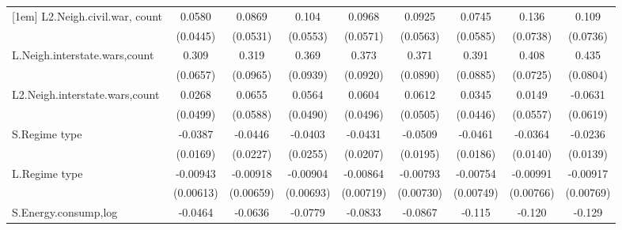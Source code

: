 \begin{table}[htbp]
\begin{tabular}{l*{8}{c}}
[1em]
L2.Neigh.civil.war, count&      0.0580         &      0.0869         &       0.104\sym{*}  &      0.0968\sym{*}  &      0.0925\sym{*}  &      0.0745         &       0.136\sym{*}  &       0.109         \\
                    &    (0.0445)         &    (0.0531)         &    (0.0553)         &    (0.0571)         &    (0.0563)         &    (0.0585)         &    (0.0738)         &    (0.0736)         \\
[1em]
L.Neigh.interstate.wars,count&       0.309\sym{***}&       0.319\sym{***}&       0.369\sym{***}&       0.373\sym{***}&       0.371\sym{***}&       0.391\sym{***}&       0.408\sym{***}&       0.435\sym{***}\\
                    &    (0.0657)         &    (0.0965)         &    (0.0939)         &    (0.0920)         &    (0.0890)         &    (0.0885)         &    (0.0725)         &    (0.0804)         \\
[1em]
L2.Neigh.interstate.wars,count&      0.0268         &      0.0655         &      0.0564         &      0.0604         &      0.0612         &      0.0345         &      0.0149         &     -0.0631         \\
                    &    (0.0499)         &    (0.0588)         &    (0.0490)         &    (0.0496)         &    (0.0505)         &    (0.0446)         &    (0.0557)         &    (0.0619)         \\
[1em]
S.Regime type       &     -0.0387\sym{**} &     -0.0446\sym{**} &     -0.0403         &     -0.0431\sym{**} &     -0.0509\sym{***}&     -0.0461\sym{**} &     -0.0364\sym{***}&     -0.0236\sym{*}  \\
                    &    (0.0169)         &    (0.0227)         &    (0.0255)         &    (0.0207)         &    (0.0195)         &    (0.0186)         &    (0.0140)         &    (0.0139)         \\
[1em]
L.Regime type       &    -0.00943         &    -0.00918         &    -0.00904         &    -0.00864         &    -0.00793         &    -0.00754         &    -0.00991         &    -0.00917         \\
                    &   (0.00613)         &   (0.00659)         &   (0.00693)         &   (0.00719)         &   (0.00730)         &   (0.00749)         &   (0.00766)         &   (0.00769)         \\
[1em]
S.Energy.consump,log&     -0.0464         &     -0.0636         &     -0.0779         &     -0.0833         &     -0.0867         &      -0.115         &      -0.120         &      -0.129         \\

\end{tabular}
\end{table}
